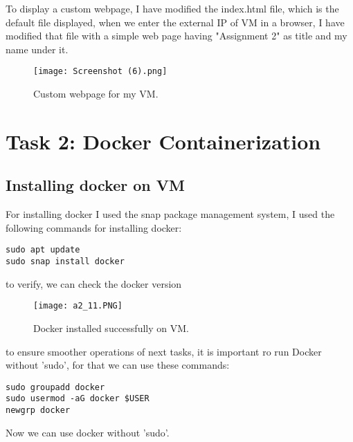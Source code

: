 \documentclass[12pt]{article}
\begin{document}
To display a custom webpage, I have modified the index.html file, which is the default file displayed, when we enter the external IP of VM in a browser, I have modified that file with a simple web page having "Assignment 2" as title and my name under it.

\begin{figure}[H]
    \centering
    \texttt{[image: Screenshot (6).png]}
    \caption{Custom webpage for my VM.}
    \label{fig:logo}
\end{figure}


\clearpage

\section{Task 2: Docker Containerization}

\subsection{Installing docker on VM}

For installing docker I used the snap package management system, I used the following commands for installing docker:
\begin{listing}[htbp]
\begin{verbatim}
sudo apt update
sudo snap install docker
\end{verbatim}
\end{listing}

to verify, we can check the docker version

\begin{figure}[H]
    \centering
    \texttt{[image: a2\_11.PNG]}
    \caption{Docker installed successfully on VM.}
    \label{fig:logo}
\end{figure}

to ensure smoother operations of next tasks, it is important ro run Docker without 'sudo', for that we can use these commands:

\begin{listing}[htbp]
\begin{verbatim}
sudo groupadd docker
sudo usermod -aG docker $USER
newgrp docker
\end{verbatim}
\end{listing}

Now we can use docker without 'sudo'.
\end{document}
